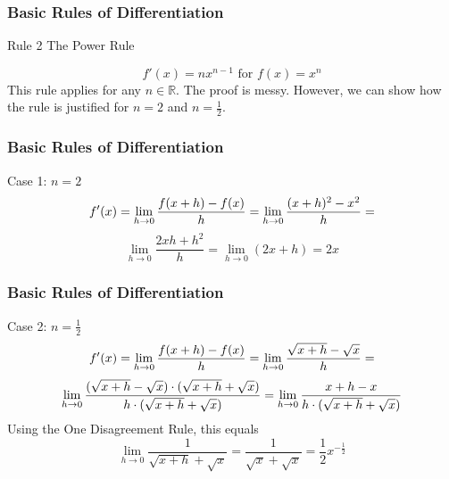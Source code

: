 \documentclass[xcolor=dvipsnames]{beamer}
\begin{document}
\begin{frame}
  \frametitle{Basic Rules of Differentiation}
  \begin{block}{Rule 2}
The Power Rule
  \end{block}
\begin{equation}
  \label{eq:oomaenee}
f'(x)=nx^{n-1}\mbox{ for }f(x)=x^{n}
\end{equation}
This rule applies for any $n\in\mathbb{R}$. The proof is messy.
However, we can show how the rule is justified for $n=2$ and
$n=\frac{1}{2}$.
\end{frame}

\begin{frame}
  \frametitle{Basic Rules of Differentiation}
Case 1: $n=2$
\begin{equation}
  \label{eq:eeyeejeu}
f'(x)=\lim_{h\rightarrow{}0}\frac{f(x+h)-f(x)}{h}=\lim_{h\rightarrow{}0}\frac{(x+h)^{2}-x^{2}}{h}=\notag
\end{equation}
\begin{equation}
  \label{eq:wuuxaise}
\lim_{h\rightarrow{}0}\frac{2xh+h^{2}}{h}=\lim_{h\rightarrow{}0}(2x+h)=2x
\end{equation}
\end{frame}

\begin{frame}
  \frametitle{Basic Rules of Differentiation}
Case 2: $n=\frac{1}{2}$
\begin{equation}
  \label{eq:shoogaka}
f'(x)=\lim_{h\rightarrow{}0}\frac{f(x+h)-f(x)}{h}=\lim_{h\rightarrow{}0}\frac{\sqrt{x+h}-\sqrt{x}}{h}=\notag
\end{equation}
\begin{equation}
  \label{eq:ohniegae}
  \lim_{h\rightarrow{}0}\frac{(\sqrt{x+h}-\sqrt{x})\cdot(\sqrt{x+h}+\sqrt{x})}{h\cdot(\sqrt{x+h}+\sqrt{x})}=\lim_{h\rightarrow{}0}\frac{x+h-x}{h\cdot(\sqrt{x+h}+\sqrt{x})}\notag
\end{equation}
Using the One Disagreement Rule, this equals
\begin{equation}
  \label{eq:ohchoacu}
  \lim_{h\rightarrow{}0}\frac{1}{\sqrt{x+h}+\sqrt{x}}=\frac{1}{\sqrt{x}+\sqrt{x}}=\frac{1}{2}x^{-\frac{1}{2}}
\end{equation}
\end{frame}
\end{document}
